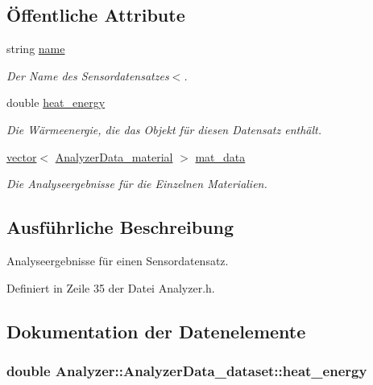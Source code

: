 \subsection*{Öffentliche Attribute}
\begin{DoxyCompactItemize}
\item 
string \hyperlink{structAnalyzer_1_1AnalyzerData__dataset_a53f3c1896123de4dc00f01e593d5f70d}{name}
\begin{DoxyCompactList}\small\item\em Der Name des Sensordatensatzes$<$. \end{DoxyCompactList}\item 
double \hyperlink{structAnalyzer_1_1AnalyzerData__dataset_aaefb798e2611790d5d956fe597bbafe0}{heat\-\_\-energy}
\begin{DoxyCompactList}\small\item\em Die Wärmeenergie, die das Objekt für diesen Datensatz enthält. \end{DoxyCompactList}\item 
\hyperlink{classstd_1_1vector}{vector}$<$ \hyperlink{structAnalyzer_1_1AnalyzerData__material}{Analyzer\-Data\-\_\-material} $>$ \hyperlink{structAnalyzer_1_1AnalyzerData__dataset_a25d0189c93bc0da58f778750edb2a2b9}{mat\-\_\-data}
\begin{DoxyCompactList}\small\item\em Die Analyseergebnisse für die Einzelnen Materialien. \end{DoxyCompactList}\end{DoxyCompactItemize}


\subsection{Ausführliche Beschreibung}
Analyseergebnisse für einen Sensordatensatz. 

Definiert in Zeile 35 der Datei Analyzer.\-h.



\subsection{Dokumentation der Datenelemente}
\hypertarget{structAnalyzer_1_1AnalyzerData__dataset_aaefb798e2611790d5d956fe597bbafe0}{
\subsubsection[{heat\-\_\-energy}]{\setlength{\rightskip}{0pt plus 5cm}double Analyzer\-::\-Analyzer\-Data\-\_\-dataset\-::heat\-\_\-energy}}\label{structAnalyzer_1_1AnalyzerData__dataset_aaefb798e2611790d5d956fe597bbafe0}



